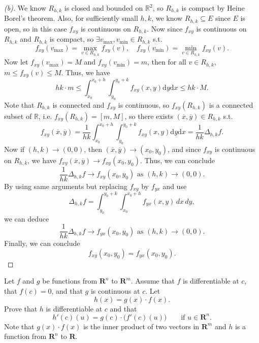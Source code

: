 \begin{proof}[(b)]
    We know \(R_{h, k}\) is closed and bounded on \(\mathbb{R} ^2\), so \(R_{h, k}\) is compact by Heine Borel's theorem. Also, for sufficiently small \(h, k\), we know \(R_{h, k} \subseteq E\) since \(E\) is open, so in this case \(f_{xy}\) is continuous on \(R_{h, k}\). Now since \(f_{xy}\) is continuous on \(R_{h, k}\) and \(R_{h, k}\) is compact, so \(\exists v_{\text{max}}, v_{\text{min}} \in R_{h, k}\) s.t. 
    \[
        f_{xy}(v_{\text{max}}) = \max _{v \in R_{h, k}} f_{xy}(v), \quad f_{xy} (v_{\text{min}}) = \min_{v \in R_{h, k}} f_{xy}(v). 
    \]          
    Now let \(f_{xy}(v_{\text{max}}) = M\) and \(f_{xy} (v_{\text{min}}) = m\), then for all \(v \in R_{h, k}\), \(m \le f_{xy}(v) \le M\). Thus, we have 
    \[
        hk \cdot m \le \int _{x_0}^{x_0 + h} \int _{y_0}^{y_0 + k} f_{xy}(x, y) \mathrm{d} y \mathrm{d} x \le hk \cdot M.  
    \]    
    Note that \(R_{h, k}\) is connected and \(f_{xy}\) is continuous, so \(f_{xy} (R_{h, k})\) is a connected subset of \(\mathbb{R} \), i.e. \(f_{xy} (R_{h, k}) = [m, M]\), so there exists \(\left( \overline{x} , \overline{y}  \right) \in R_{h, k} \) s.t. 
    \[
        f_{xy} \left( \overline{x} , \overline{y}  \right) = \frac{1}{hk} \int _{x_0}^{x_0 + h} \int _{y_0}^{y_0 + k} f_{xy} (x, y) \mathrm{d} y \mathrm{d} x = \frac{1}{hk} \Delta _{h, k} f.   
    \]      
    Now if \((h, k) \to (0, 0)\), then \((\overline{x} , \overline{y} ) \to (x_0, y_0)\), and since \(f_{xy}\) is continuous on \(R_{h, k}\), we have \(f_{xy} \left( \overline{x} , \overline{y}  \right) \to f_{xy}(x_0, y_0) \). Thus, we can conclude 
    \[
        \frac{1}{hk} \Delta _{h, k} f \to f_{xy} (x_0, y_0) \text{ as } (h, k) \to (0, 0). 
    \]
    By using same arguments but replacing \(f_{xy}\) by \(f_{yx}\) and use 
    \[
        \Delta_{h,k} f = \int_{y_0}^{y_0+k}\int_{x_0}^{x_0+h} f_{yx}(x,y)\,dx\,dy,
    \]       
    we can deduce 
    \[
        \frac{1}{hk} \Delta _{h, k} f \to f_{yx} (x_0, y_0) \text{ as } (h, k) \to (0, 0).
    \]
    Finally, we can conclude 
    \[
        f_{xy}(x_0, y_0) = f_{yx} (x_0, y_0).
    \]
\end{proof}

\begin{problem}
    Let $f$ and $g$ be functions from $\mathbf{R}^n$ to $\mathbf{R}^m$. Assume that $f$ is
differentiable at $c$, that $f(c)=0$, and that $g$ is continuous at $c$.
Let
\[
h(x)=g(x)\cdot f(x).
\]
Prove that $h$ is differentiable at $c$ and that
\[
h'(c)(u)=g(c)\cdot\bigl(f'(c)(u)\bigr)
\qquad \text{if } u\in \mathbf{R}^n.
\] Note that $g(x)\cdot f(x)$ is the inner product of two vectors in $\mathbf{R}^m$ and $h$ is a function from
$\mathbf{R}^n$ to $\mathbf{R}$.
\end{problem}

